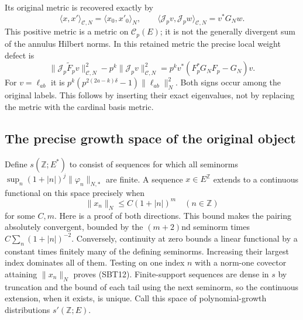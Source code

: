 \documentclass[11pt]{article}
\begin{document}
Its original metric is recovered exactly by
\begin{equation}\tag{SBT10}
 \langle x,x'\rangle_{\mathcal C,N}
       =\langle x_0,x'_0\rangle_N,\qquad
 \langle\mathcal J_pv,\mathcal J_pw\rangle_{\mathcal C,N}
       =v^*G_Nw .
\end{equation}
This positive metric is a metric on $\mathcal C_p(E)$; it is not the
generally divergent sum of the annulus Hilbert norms. In this retained
metric the precise local weight defect is
\begin{equation}\tag{SBT11}
 \|\mathcal J_p\widetilde F_pv\|_{\mathcal C,N}^2
       -p^k\|\mathcal J_pv\|_{\mathcal C,N}^2
   =p^k v^*(F_p^*G_NF_p-G_N)v .
\end{equation}
For $v=\ell_{ab}$ it is
$p^k(p^{2(2a-k)\delta}-1)\|\ell_{ab}\|_N^2$.
Both signs occur among the original labels. This follows by inserting
their exact eigenvalues, not by replacing the metric with the cardinal
basis metric.

\subsection{The precise growth space of the original object}

Define $s(\mathbb Z;E^*)$ to consist of sequences for which all
seminorms $\sup_n(1+|n|)^j\|\varphi_n\|_{N,*}$ are finite.
A sequence $x\in E^{\mathbb Z}$ extends to a continuous functional
on this space precisely when
\begin{equation}\tag{SBT12}
 \|x_n\|_N\le C(1+|n|)^m\quad(n\in\mathbb Z)
\end{equation}
for some $C,m$. Here is a proof of both directions. This bound makes
the pairing absolutely convergent, bounded by the $(m+2)$nd seminorm
times $C\sum_n(1+|n|)^{-2}$. Conversely, continuity at zero bounds a
linear functional by a constant times finitely many of the defining
seminorms. Increasing their largest index dominates all of them.
Testing on one index $n$ with a norm-one covector attaining
$\|x_n\|_N$ proves (SBT12). Finite-support sequences are dense in
$s$ by truncation and the bound of each tail using the next seminorm,
so the continuous extension, when it exists, is unique. Call this
space of polynomial-growth distributions $s'(\mathbb Z;E)$.
\end{document}
